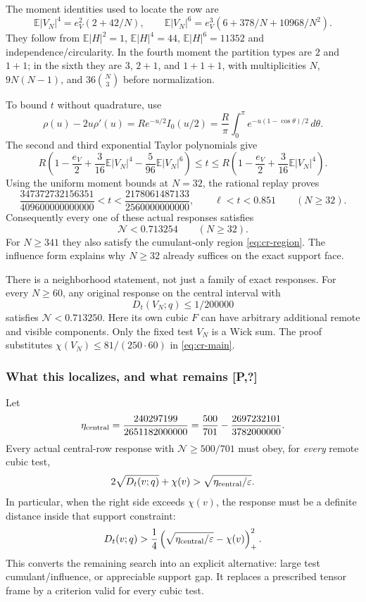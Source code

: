 The moment identities used to locate the row are
\[
 \mathbb E|V_N|^4=e_V^2(2+42/N),\qquad
 \mathbb E|V_N|^6=e_V^3(6+378/N+10968/N^2).
\]
They follow from $\mathbb E|H|^2=1$, $\mathbb E|H|^4=44$,
$\mathbb E|H|^6=11352$ and independence/circularity. In the fourth
moment the partition types are $2$ and $1+1$; in the sixth they are
$3$, $2+1$, and $1+1+1$, with multiplicities
$N$, $9N(N-1)$, and $36\binom N3$ before normalization.

To bound $t$ without quadrature, use
\[
 \rho(u)-2u\rho'(u)=R e^{-u/2}I_0(u/2)
 =\frac R\pi\int_0^\pi e^{-u(1-\cos\theta)/2}\,d\theta.
\]
The second and third exponential Taylor polynomials give
\[
 R\left(1-\frac{e_V}2+\frac3{16}\mathbb E|V_N|^4
                 -\frac5{96}\mathbb E|V_N|^6\right)
 \le t\le
 R\left(1-\frac{e_V}2+\frac3{16}\mathbb E|V_N|^4\right).
\]
Using the uniform moment bounds at $N=32$, the rational replay proves
\[
 \frac{347372732156351}{409600000000000}
       <t<\frac{2178061487133}{2560000000000},
 \qquad \ell<t<0.851\qquad(N\ge32).
\]
Consequently every one of these actual responses satisfies
\[
 \mathcal N<0.713254\qquad(N\ge32).
\]
For $N\ge341$ they also satisfy the cumulant-only region
\eqref{eq:cr-region}. The influence form explains why $N\ge32$ already
suffices on the exact support face.

There is a neighborhood statement, not just a family of exact responses.
For every $N\ge60$, any original response on the central interval with
\[
 D_t(V_N;q)\le1/200000
\]
satisfies $\mathcal N<0.713250$. Here its own cubic $F$ can have arbitrary
additional remote and visible components. Only the fixed test $V_N$
is a Wick sum. The proof substitutes
$\chi(V_N)\le81/(250\cdot60)$ in \eqref{eq:cr-main}.

\subsubsection{What this localizes, and what remains [P,?]}

Let
\[
 \eta_{\rm central}=\frac{240297199}{2651182000000}
 =\frac{500}{701}-\frac{2697232101}{3782000000}.
\]
Every actual central-row response with $\mathcal N\ge500/701$ must obey,
for \emph{every} remote cubic test,
\[
 2\sqrt{D_t(v;q)}+\chi(v)
       >\sqrt{\eta_{\rm central}/\varepsilon}.
\]
In particular, when the right side exceeds $\chi(v)$, the response must
be a definite distance inside that support constraint:
\[
 D_t(v;q)>\frac14
     \left(\sqrt{\eta_{\rm central}/\varepsilon}-\chi(v)\right)_+^2.
\]
This converts the remaining search into an explicit alternative:
large test cumulant/influence, or appreciable support gap. It replaces
a prescribed tensor frame by a criterion valid for every cubic test.

